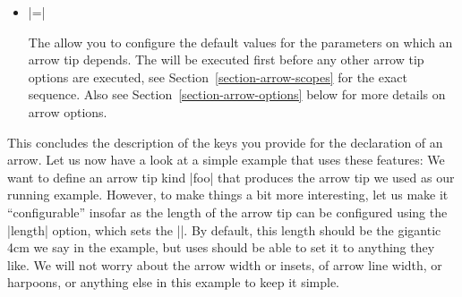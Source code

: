 \begin{command}{\pgfdeclarearrow{}}
\begin{itemize}
            For most arrow tips it does, however, make sense to bend them.
            There are (at least) two different mathematical ways of doing so,
            see Section~\ref{section-library-curvilinear} for details. Which of
            these ways is use can be configured by setting  to
            either |orthogonal| or to |polar|. It is best to try simply try out
            both when designing an arrow tip to see which works better. Since
            |orthogonal| is quicker and often gives good oder even better
            results, it is the default. Some arrow tips, however, profit from
            saying |bending mode=polar|.
        \item {}|=|

            The  allow you to configure the default values for
            the parameters on which an arrow tip depends. The 
            will be executed first before any other arrow tip options are
            executed, see Section~\ref{section-arrow-scopes} for the exact
            sequence. Also see Section~\ref{section-arrow-options} below for
            more details on arrow options.
    \end{itemize}

    This concludes the description of the keys you provide for the declaration
    of an arrow. Let us now have a look at a simple example that uses these
    features: We want to define an arrow tip kind |foo| that produces the arrow
    tip we used as our running example. However, to make things a bit more
    interesting, let us make it ``configurable'' insofar as the length of the
    arrow tip can be configured using the |length| option, which sets the
    |\pgfarrowlength|. By default, this length should be the gigantic 4cm we
    say in the example, but uses should be able to set it to anything they
    like. We will not worry about the arrow width or insets, of arrow line
    width, or harpoons, or anything else in this example to keep it simple.


\end{command}
